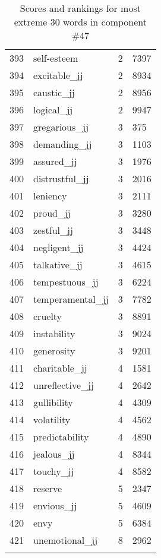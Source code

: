 \begin{longtable}[!htbp]{| rlr@{.}l |}
    393 & self-esteem & 2 & 7397 \\
    394 & excitable\_jj & 2 & 8934 \\
    395 & caustic\_jj & 2 & 8956 \\
    396 & logical\_jj & 2 & 9947 \\
    397 & gregarious\_jj & 3 & 375 \\
    398 & demanding\_jj & 3 & 1103 \\
    399 & assured\_jj & 3 & 1976 \\
    400 & distrustful\_jj & 3 & 2016 \\
    401 & leniency & 3 & 2111 \\
    402 & proud\_jj & 3 & 3280 \\
    403 & zestful\_jj & 3 & 3448 \\
    404 & negligent\_jj & 3 & 4424 \\
    405 & talkative\_jj & 3 & 4615 \\
    406 & tempestuous\_jj & 3 & 6224 \\
    407 & temperamental\_jj & 3 & 7782 \\
    408 & cruelty & 3 & 8891 \\
    409 & instability & 3 & 9024 \\
    410 & generosity & 3 & 9201 \\
    411 & charitable\_jj & 4 & 1581 \\
    412 & unreflective\_jj & 4 & 2642 \\
    413 & gullibility & 4 & 4309 \\
    414 & volatility & 4 & 4562 \\
    415 & predictability & 4 & 4890 \\
    416 & jealous\_jj & 4 & 8344 \\
    417 & touchy\_jj & 4 & 8582 \\
    418 & reserve & 5 & 2347 \\
    419 & envious\_jj & 5 & 4609 \\
    420 & envy & 5 & 6384 \\
    421 & unemotional\_jj & 8 & 2962 \\
    \hline
    \caption{Scores and rankings for most extreme 30 words in component \#47} \\
\end{longtable}
